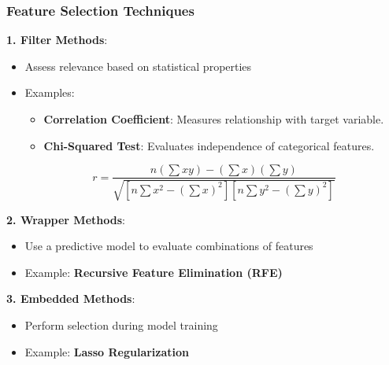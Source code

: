\documentclass[aspectratio=169]{beamer}
\begin{document}
\begin{frame}[fragile]
    \frametitle{Feature Selection Techniques}
    \textbf{1. Filter Methods}:
    \begin{itemize}
        \item Assess relevance based on statistical properties
        \item Examples:
        \begin{itemize}
            \item \textbf{Correlation Coefficient}: Measures relationship with target variable.
            \item \textbf{Chi-Squared Test}: Evaluates independence of categorical features.
        \end{itemize}
        \begin{equation}
            r = \frac{n(\sum xy) - (\sum x)(\sum y)}{\sqrt{[n\sum x^2 - (\sum x)^2][n\sum y^2 - (\sum y)^2]}}
        \end{equation}
    \end{itemize}
    
    \textbf{2. Wrapper Methods}:
    \begin{itemize}
        \item Use a predictive model to evaluate combinations of features
        \item Example: \textbf{Recursive Feature Elimination (RFE)}
    \end{itemize}
    
    \textbf{3. Embedded Methods}:
    \begin{itemize}
        \item Perform selection during model training
        \item Example: \textbf{Lasso Regularization}
    \end{itemize}
\end{frame}
\end{document}
